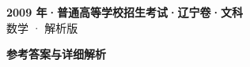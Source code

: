 \documentclass[zihao=-4, a4paper]{ctexart}
\begin{document}
\begin{center}
  {\Large\bfseries 2009 年·普通高等学校招生考试·辽宁卷·文科}\\[4pt]
  {\large 数学 · 解析版}
\end{center}
\medskip
{}

\clearpage
{}
\begin{center}{\Large\bfseries 参考答案与详细解析}\end{center}
\medskip

\end{document}
